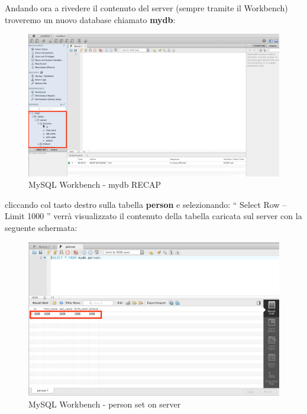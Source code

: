 Andando ora a rivedere il contenuto del server (sempre tramite il Workbench) troveremo un nuovo database chiamato \textbf{mydb}:

\begin{center}
\begin{figure}[H]
\centering
\includegraphics[scale=0.8]{figures/mySQL_workbench_mydb.png}
\caption{MySQL Workbench - mydb RECAP}
\end{figure}
\end{center}

cliccando col tasto destro sulla tabella \textbf{person} e selezionando: “ Select Row – Limit 1000 ” verrà visualizzato il contenuto della tabella caricata sul server con la seguente schermata: 

\begin{center}
\begin{figure}[H]
\centering
\includegraphics[scale=0.8]{figures/mySQL_workbench_person.png}
\caption{MySQL Workbench - person set on server}
\end{figure}
\end{center}

